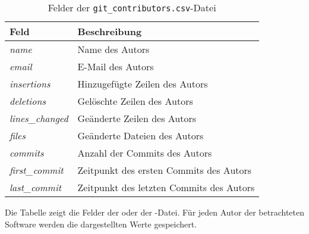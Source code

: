 \begin{table}
    \begin{tabularx}{\textwidth}{XL{10.2cm}}
        \toprule
        \textbf{Feld}         & \textbf{Beschreibung}                   \\ \midrule
        \emph{name}           & Name des Autors                         \\
        \emph{email}          & E-Mail des Autors                       \\
        \emph{insertions}     & Hinzugefügte Zeilen des Autors          \\
        \emph{deletions}      & Gelöschte Zeilen des Autors             \\
        \emph{lines\_changed} & Geänderte Zeilen des Autors             \\
        \emph{files}          & Geänderte Dateien des Autors            \\
        \emph{commits}        & Anzahl der Commits des Autors           \\
        \emph{first\_commit}  & Zeitpunkt des ersten Commits des Autors \\
        \emph{last\_commit}  & Zeitpunkt des letzten Commits des Autors \\
        \bottomrule
    \end{tabularx}
    \caption{Felder der \texttt{git\_contributors.csv}-Datei}
    \label{tab:git_contributors}
    \small
    Die Tabelle zeigt die Felder der  oder der -Datei. Für jeden Autor der betrachteten Software werden die dargestellten Werte gespeichert.
\end{table}
